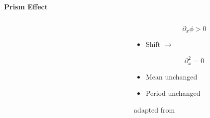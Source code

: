\documentclass[
 ]{beamer}%
\begin{document}
\begin{frame}
    \textbf{Prism Effect}
    \begin{columns}
        \begin{column}{0.45\textwidth}
            \prismeffect
            
            \prismillumination
        \end{column}
        \begin{column}{0.05\textwidth}
            
        \end{column}
        \begin{column}{0.35\textwidth}
            \vspace{-1cm}
            \begin{equation*}
                \partial_x\phi>0
            \end{equation*}
            \begin{itemize}
                \vspace{-0.65cm}
                \item Shift $\rightarrow$
            \end{itemize}

            \vspace{0.4cm}
            \begin{equation*}
                \partial_x^2=0
            \end{equation*}
            \begin{itemize}
                \vspace{-0.65cm}
                \item Mean unchanged
                \item Period unchanged
            \end{itemize}
            \vspace{1.2cm}
            \raggedleft
            \scriptsize adapted from \cite{Morgan2019}
        \end{column}
    \end{columns}
\end{frame}
\end{document}
